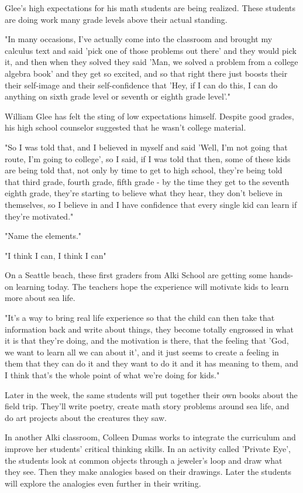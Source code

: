 Glee's high expectations for his math students are being realized. These students are doing work many grade levels above their actual standing.

"In many occasions, I've actually come into the classroom and brought my calculus text and said 'pick one of those problems out there' and they would pick it, and then when they solved they said 'Man, we solved a problem from a college algebra book' and they get so excited, and so that right there just boosts their their self-image and their self-confidence that 'Hey, if I can do this, I can do anything on sixth grade level or seventh or eighth grade level'."

William Glee has felt the sting of low expectations himself. Despite good grades, his high school counselor suggested that he wasn't college material.

"So I was told that, and I believed in myself and said 'Well, I'm not going that route, I'm going to college', so I said, if I was told that then, some of these kids are being told that, not only by time to get to high school, they're being told that third grade, fourth grade, fifth grade - by the time they get to the seventh eighth grade, they're starting to believe what they hear, they don't believe in themselves, so I believe in and I have confidence that every single kid can learn if they're motivated."

"Name the elements."

"I think I can, I think I can"

On a Seattle beach, these first graders from Alki School are getting some hands-on learning today. The teachers hope the experience will motivate kids to learn more about sea life.

"It's a way to bring real life experience so that the child can then take that information back and write about things, they become totally engrossed in what it is that they're doing, and the motivation is there, that the feeling that 'God, we want to learn all we can about it', and it just seems to create a feeling in them that they can do it and they want to do it and it has meaning to them, and I think that's the whole point of what we're doing for kids."

Later in the week, the same students will put together their own books about the field trip. They'll write poetry, create math story problems around sea life, and do art projects about the creatures they saw.

In another Alki classroom, Colleen Dumas works to integrate the curriculum and improve her students' critical thinking skills. In an activity called 'Private Eye', the students look at common objects through a jeweler's loop and draw what they see. Then they make analogies based on their drawings. Later the students will explore the analogies even further in their writing.

